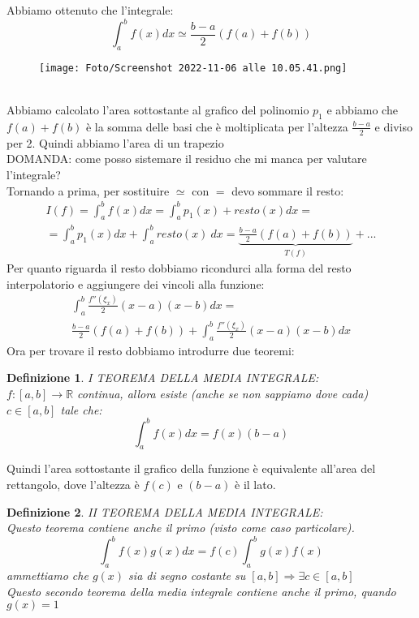 \documentclass[a4paper, portrait]{book}
\numberwithin{equation}{chapter} %
\newtheorem{definition}{Definizione}
\begin{document}
Abbiamo ottenuto che l'integrale:
\begin{equation}
    \int_a^b f(x) dx \simeq \frac{b-a}{2}(f(a)+f(b))
\end{equation}
\begin{figure}[h!]
    \centering
    \texttt{[image: Foto/Screenshot 2022-11-06 alle 10.05.41.png]}
    \caption{}
\end{figure}
\\Abbiamo calcolato l'area sottostante al grafico del polinomio $p_1$ e abbiamo che $f(a) + f(b)$ è la somma delle basi che è moltiplicata per l'altezza $\frac{b-a}{2}$ e diviso per 2. Quindi abbiamo l'area di un trapezio\\
DOMANDA: come posso sistemare il residuo che mi manca per valutare l'integrale?\\
Tornando a prima, per sostituire $\simeq$ con $=$ devo sommare il resto:
\begin{gather}
    I(f) = \int_a^b f(x) dx = \int_a^b p_1(x) + resto(x) dx = \\
    = \int_a^b p_1(x) dx + \int_a^b resto(x) \ dx =
    \underbrace{\frac{b-a}{2}(f(a)+f(b))}_{T(f)} + ...
\end{gather}
Per quanto riguarda il resto dobbiamo ricondurci alla forma del resto interpolatorio e aggiungere dei vincoli alla funzione:
\begin{gather}
    \int_a^b \frac{f''(\xi_x)}{2}(x-a)(x-b) dx = \\
    \frac{b-a}{2}(f(a)+f(b)) + \int_a^b \frac{f''(\xi_x)}{2}(x-a)(x-b)dx
\end{gather}
Ora per trovare il resto dobbiamo introdurre due teoremi:
\begin{definition}
    I TEOREMA DELLA MEDIA INTEGRALE:\\
    $f:[a,b] \rightarrow \mathbb{R}$ continua, allora esiste (anche se non sappiamo dove cada) $c \in [a,b]$ tale che:
    \begin{equation}
        \int_a^b f(x) dx = f(x) (b-a)
    \end{equation}
\end{definition}
Quindi l'area sottostante il grafico della funzione è equivalente all'area del rettangolo, dove l'altezza è $f(c)$ e $(b-a)$ è il lato.\\
\begin{definition}
    II TEOREMA DELLA MEDIA INTEGRALE:\\
    Questo teorema contiene anche il primo (visto come caso particolare).\\
    \begin{equation}
        \int_a^b f(x) g(x) dx = f(c) \int_a^b g(x) f(x)
    \end{equation}
    ammettiamo che $g(x)$ sia di segno costante su $[a,b] \Rightarrow \exists c \in [a,b]$\\
    Questo secondo teorema della media integrale contiene anche il primo, quando $g(x) = 1$
\end{definition}
\end{document}
